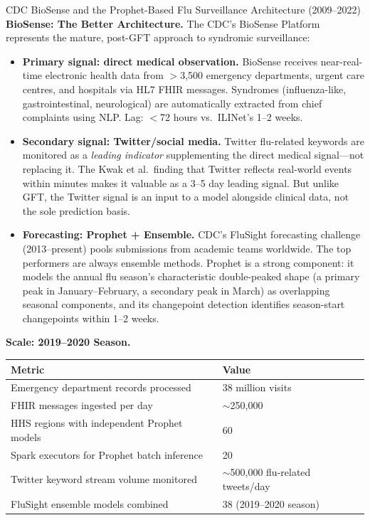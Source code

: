 \begin{casestudy}{CDC BioSense and the Prophet-Based Flu Surveillance
  Architecture (2009--2022)}
\textbf{BioSense: The Better Architecture.}
The CDC's BioSense Platform represents the mature, post-GFT approach
to syndromic surveillance:
\begin{itemize}
  \item \textbf{Primary signal: direct medical observation.} BioSense
        receives near-real-time electronic health data from $>$3{,}500
        emergency departments, urgent care centres, and hospitals
        via HL7 FHIR messages. Syndromes (influenza-like, gastrointestinal,
        neurological) are automatically extracted from chief complaints
        using NLP. Lag: $<$72 hours vs.\ ILINet's 1--2 weeks.
  \item \textbf{Secondary signal: Twitter/social media.} Twitter flu-related
        keywords are monitored as a \emph{leading indicator} supplementing
        the direct medical signal---not replacing it. The Kwak et al.\ finding
        that Twitter reflects real-world events within minutes makes it
        valuable as a 3--5 day leading signal. But unlike GFT, the Twitter
        signal is an input to a model alongside clinical data, not the
        sole prediction basis.
  \item \textbf{Forecasting: Prophet + Ensemble.}
        CDC's FluSight forecasting challenge (2013--present) pools
        submissions from academic teams worldwide. The top performers
        are always ensemble methods. Prophet is a strong component:
        it models the annual flu season's characteristic double-peaked
        shape (a primary peak in January--February, a secondary peak
        in March) as overlapping seasonal components, and its changepoint
        detection identifies season-start changepoints within 1--2 weeks.
\end{itemize}

\textbf{Scale: 2019--2020 Season.}
\begin{center}
\small
\renewcommand{\arraystretch}{1.25}
\begin{tabular}{ll}
  \toprule
  \textbf{Metric} & \textbf{Value} \\
  \midrule
  Emergency department records processed     & 38 million visits \\
  FHIR messages ingested per day             & $\sim$250{,}000 \\
  HHS regions with independent Prophet models & 60 \\
  Spark executors for Prophet batch inference & 20 \\
  Twitter keyword stream volume monitored    & $\sim$500{,}000 flu-related tweets/day \\
  FluSight ensemble models combined          & 38 (2019--2020 season) \\
  \bottomrule
\end{tabular}
\end{center}


\end{casestudy}
